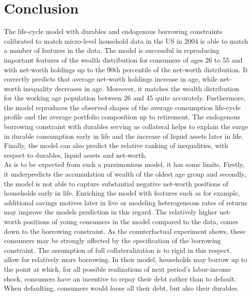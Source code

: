 \documentclass[a4paper,12pt,legno]{article}
\begin{document}
\section{Conclusion}
\label{conclusion}
The life-cycle model with durables and endogenous borrowing constraints calibrated to match micro-level household data in the US in 2004 is able to match a number of features in the data. The model is successful in reproducing important features of the wealth distribution for consumers of ages 26 to 55 and with net-worth holdings up to the 90th percentile of the net-worth distribution. It correctly predicts that average net-worth holdings increase in age, while net-worth inequality decreases in age. Moreover, it matches the wealth distribution for the working age population between 26 and 45 quite accurately. Furthermore, the model reproduces the observed shapes of the average consumption life-cycle profile and the average portfolio composition up to retirement. The endogenous borrowing constraint with durables serving as collateral helps to explain the surge in durable consumption early in life and the increase of liquid assets later in life. Finally, the model can also predict the relative ranking of inequalities, with respect to durables, liquid assets and net-worth. \\
As is to be expected from such a parsimonious model, it has some limits. Firstly, it underpredicts the accumulation of wealth of the oldest age group and secondly, the model is not able to capture substantial negative net-worth positions of households early in life. Enriching the model with features such as for example, additional savings motives later in live \citep{de2004wealth} or modeling heterogeneous rates of returns \citep{benhabib2011distribution} may improve the models prediction in this regard. The relatively higher net-worth positions of young consumers in the model compared to the data, comes down to the borrowing constraint. As the counterfactual experiment shows, these consumers may be strongly affected by the specification of the borrowing constraint. The assumption of full collateralization is to rigid in this respect. \cite{FV&K2011} allow for relatively more borrowing. In their model, households may borrow up to the point at which, for all possible realizations of next period's labor-income shock, consumers  have an incentive to repay their debt rather than to default. When defaulting, consumers would loose all their debt, but also their durables.


\end{document}
